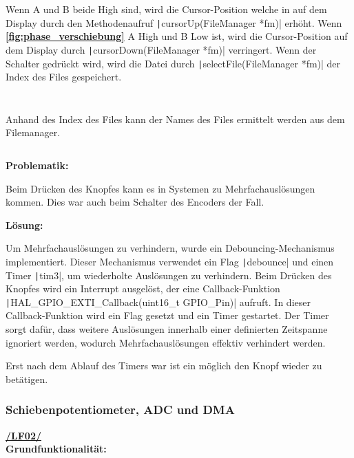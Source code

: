 Wenn A und B beide High sind\cite{rotary-encoder}, wird die Cursor-Position welche in auf dem Display durch den Methodenaufruf \texttt|cursorUp(FileManager *fm)|
erhöht. Wenn  \textbf{\autoref{fig:phase_verschiebung}} A High und B Low ist, wird die Cursor-Position auf dem Display durch \texttt|cursorDown(FileManager *fm)| verringert. Wenn der Schalter gedrückt wird, wird die Datei durch \texttt|selectFile(FileManager *fm)| der Index des Files gespeichert. 

\newpage 
 \inputminted[firstline=68, lastline=74]{c}{../../f401_display_encoder_fader_test/Core/Src/filemanager.c}
 
  \inputminted[firstline=84, lastline=90]{c}{../../f401_display_encoder_fader_test/Core/Src/filemanager.c}
  
Anhand des Index des Files kann der Names des Files ermittelt werden aus dem Filemanager.

	
\inputminted[firstline=159, lastline=161]{c}{../../f401_display_encoder_fader_test/Core/Src/filemanager.c}

\textbf{Problematik:}

Beim Drücken des Knopfes kann es in Systemen zu Mehrfachauslösungen kommen. Dies war auch beim Schalter des Encoders der Fall.

\textbf{Lösung:}

Um Mehrfachauslösungen zu verhindern, wurde ein Debouncing-Mechanismus implementiert. Dieser Mechanismus verwendet ein Flag \texttt|debounce| und einen Timer \texttt|tim3|, um wiederholte Auslösungen zu verhindern. Beim Drücken des Knopfes wird ein Interrupt ausgelöst, der eine Callback-Funktion \texttt|HAL_GPIO_EXTI_Callback(uint16_t GPIO_Pin)| aufruft. In dieser Callback-Funktion wird ein Flag gesetzt und ein Timer gestartet. Der Timer sorgt dafür, dass weitere Auslösungen innerhalb einer definierten Zeitspanne ignoriert werden, wodurch Mehrfachauslösungen effektiv verhindert werden.

Erst nach dem Ablauf des Timers war ist ein möglich den Knopf wieder zu betätigen.

\newpage
\subsubsection{Schiebenpotentiometer, ADC und DMA}
\textbf{\hyperlink{LF02_Link}{/LF02/}} \\

\textbf{Grundfunktionalität:}\\



